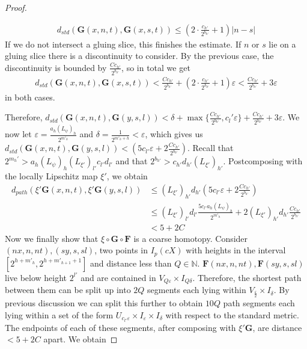 \documentclass[a4paper,11pt]{article}
\theoremstyle{definition}
\theoremstyle{plain}
\theoremstyle{remark}
\begin{document}
{\begin{proof}
\begin{enumerate}
\begin{align*}
d_{std}(\mathbf{G}(x,n,t), \mathbf{G}(x,s,t))\leq (2\cdot \frac{c_{h'}}{2^{b_{h'}}}+1) |n-s|
\end{align*}
If we do not intersect a gluing slice, this finishes the estimate. If $n$ or $s$ lie on a gluing slice there is a discontinuity to consider. By the previous case, the discontinuity is bounded by $\frac{Cc_{h'}}{2^{b_{h'}}}$, so in total we get
\begin{align*}
d_{std}(\mathbf{G}(x,n,t), \mathbf{G}(x,s,t))< \frac{Cc_{h'}}{2^{b_{h'}}} + (2\cdot \frac{c_{h'}}{2^{b_{h'}}}+1) \varepsilon <\frac{Cc_{h'}}{2^{b_{h'}}} + 3\varepsilon
\end{align*}  
in both cases.
\end{enumerate} 

Therefore, $d_{std}(\mathbf{G}(x,n,t),\mathbf{G}(y,s,l))<  \delta +\max\{\frac{Cc_{h'}}{2^{b_{h'}}},c_{l}'\varepsilon\}+\frac{Cc_{h'}}{2^{b_{h'}}} + 3\varepsilon$. We now let $\varepsilon =  \frac{a_{h}(L_{\psi})_{h}}{2^{m'_{h}}}$ and $\delta = \frac{1}{2^{m'_{h}+h}}<\varepsilon$, which gives us $d_{std}(\mathbf{G}(x,n,t),\mathbf{G}(y,s,l))<  (5c_{l'}\varepsilon + 2\frac{Cc_{h'}}{2^{b_{h'}}})$. Recall that $2^{m_{h}'}> a_{h} (L_{\psi})_{h} (L_{\xi'})_{l'}c_{l'}d_{l'}$ and that $2^{b_{h'}} > c_{h'}d_{h'} (L_{\xi'})_{h'}$.  Postcomposing with the locally Lipschitz map $\xi'$, we obtain 
\begin{align*}
d_{path}(\xi'\mathbf{G}(x,n,t),\xi'\mathbf{G}(y,s,l))&\leq (L_{\xi'})_{h'} d_{h'} (5c_{l'}\varepsilon + 2\frac{Cc_{h'}}{2^{b_{h'}}})\\
&\leq (L_{\xi'})_{l'}d_{l'}\frac{5c_{l'}a_{h}(L_{\psi})_{h}}{2^{m'_{h}}} +2(L_{\xi'})_{h'} d_{h'}\frac{Cc_{h'}}{2^{b_{h'}}}\\
&<5 +2C
\end{align*}
Now we finally show that $\xi\circ \mathbf{G}\circ \mathbf{F}$ is a coarse homotopy. Consider $(nx,n,nt),(sy,s,sl)$, two points in $I_{p}(cX)$ with heights in the interval $ [2^{h+m'_{h}},2^{h+m'_{h+1}+1}]$ and distance less than $Q\in \mathbb{N}$. $\mathbf{F}(nx,n,nt), \mathbf{F}(sy,s,sl)$ live below height $2^{l'}$ and are contained in $V_{Q\varepsilon} \times I_{Q\delta}$. Therefore, the shortest path between them can be split up into $2Q$ segments each lying within $V_{\frac{\varepsilon}{2}} \times I_{\delta}$. By previous discussion we can split this further to obtain $10Q$ path segments each lying within a set of the form $U_{c_{l'}\varepsilon} \times I_{\varepsilon} \times I_{\delta}$ with respect to the standard metric. The endpoints of each of these segments, after composing with $\xi' \mathbf{G}$, are distance $< 5+2C$ apart. We obtain

\end{proof}}
\end{document}
